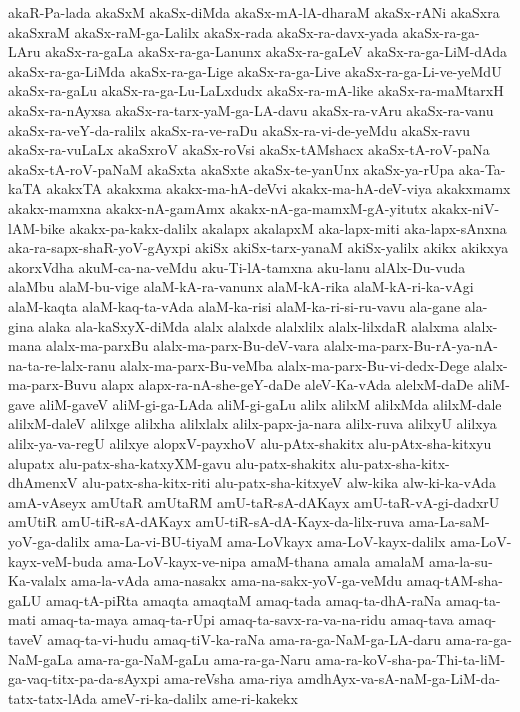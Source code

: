 {akaR-Pa-lada
akaSxM
akaSx-diMda
akaSx-mA-lA-dharaM
akaSx-rANi
akaSxra
akaSxraM
akaSx-raM-ga-Lalilx
akaSx-rada
akaSx-ra-davx-yada
akaSx-ra-ga-LAru
akaSx-ra-gaLa
akaSx-ra-ga-Lanunx
akaSx-ra-gaLeV
akaSx-ra-ga-LiM-dAda
akaSx-ra-ga-LiMda
akaSx-ra-ga-Lige
akaSx-ra-ga-Live
akaSx-ra-ga-Li-ve-yeMdU
akaSx-ra-gaLu
akaSx-ra-ga-Lu-LaLxdudx
akaSx-ra-mA-like
akaSx-ra-maMtarxH
akaSx-ra-nAyxsa
akaSx-ra-tarx-yaM-ga-LA-davu
akaSx-ra-vAru
akaSx-ra-vanu
akaSx-ra-veY-da-ralilx
akaSx-ra-ve-raDu
akaSx-ra-vi-de-yeMdu
akaSx-ravu
akaSx-ra-vuLaLx
akaSxroV
akaSx-roVsi
akaSx-tAMshacx
akaSx-tA-roV-paNa
akaSx-tA-roV-paNaM
akaSxta
akaSxte
akaSx-te-yanUnx
akaSx-ya-rUpa
aka-Ta-kaTA
akakxTA
akakxma
akakx-ma-hA-deVvi
akakx-ma-hA-deV-viya
akakxmamx
akakx-mamxna
akakx-nA-gamAmx
akakx-nA-ga-mamxM-gA-yitutx
akakx-niV-lAM-bike
akakx-pa-kakx-dalilx
akalapx
akalapxM
aka-lapx-miti
aka-lapx-sAnxna
aka-ra-sapx-shaR-yoV-gAyxpi
akiSx
akiSx-tarx-yanaM
akiSx-yalilx
akikx
akikxya
akorxVdha
akuM-ca-na-veMdu
aku-Ti-lA-tamxna
aku-lanu
alAlx-Du-vuda
alaMbu
alaM-bu-vige
alaM-kA-ra-vanunx
alaM-kA-rika
alaM-kA-ri-ka-vAgi
alaM-kaqta
alaM-kaq-ta-vAda
alaM-ka-risi
alaM-ka-ri-si-ru-vavu
ala-gane
ala-gina
alaka
ala-kaSxyX-diMda
alalx
alalxde
alalxlilx
alalx-lilxdaR
alalxma
alalx-mana
alalx-ma-parxBu
alalx-ma-parx-Bu-deV-vara
alalx-ma-parx-Bu-rA-ya-nA-na-ta-re-lalx-ranu
alalx-ma-parx-Bu-veMba
alalx-ma-parx-Bu-vi-dedx-Dege
alalx-ma-parx-Buvu
alapx
alapx-ra-nA-she-geY-daDe
aleV-Ka-vAda
alelxM-daDe
aliM-gave
aliM-gaveV
aliM-gi-ga-LAda
aliM-gi-gaLu
alilx
alilxM
alilxMda
alilxM-dale
alilxM-daleV
alilxge
alilxha
alilxlalx
alilx-papx-ja-nara
alilx-ruva
alilxyU
alilxya
alilx-ya-va-regU
alilxye
alopxV-payxhoV
alu-pAtx-shakitx
alu-pAtx-sha-kitxyu
alupatx
alu-patx-sha-katxyXM-gavu
alu-patx-shakitx
alu-patx-sha-kitx-dhAmenxV
alu-patx-sha-kitx-riti
alu-patx-sha-kitxyeV
alw-kika
alw-ki-ka-vAda
amA-vAseyx
amUtaR
amUtaRM
amU-taR-sA-dAKayx
amU-taR-vA-gi-dadxrU
amUtiR
amU-tiR-sA-dAKayx
amU-tiR-sA-dA-Kayx-da-lilx-ruva
ama-La-saM-yoV-ga-dalilx
ama-La-vi-BU-tiyaM
ama-LoVkayx
ama-LoV-kayx-dalilx
ama-LoV-kayx-veM-buda
ama-LoV-kayx-ve-nipa
amaM-thana
amala
amalaM
ama-la-su-Ka-valalx
ama-la-vAda
ama-nasakx
ama-na-sakx-yoV-ga-veMdu
amaq-tAM-sha-gaLU
amaq-tA-piRta
amaqta
amaqtaM
amaq-tada
amaq-ta-dhA-raNa
amaq-ta-mati
amaq-ta-maya
amaq-ta-rUpi
amaq-ta-savx-ra-va-na-ridu
amaq-tava
amaq-taveV
amaq-ta-vi-hudu
amaq-tiV-ka-raNa
ama-ra-ga-NaM-ga-LA-daru
ama-ra-ga-NaM-gaLa
ama-ra-ga-NaM-gaLu
ama-ra-ga-Naru
ama-ra-koV-sha-pa-Thi-ta-liM-ga-vaq-titx-pa-da-sAyxpi
ama-reVsha
ama-riya
amdhAyx-va-sA-naM-ga-LiM-da-tatx-tatx-lAda
ameV-ri-ka-dalilx
ame-ri-kakekx
}
